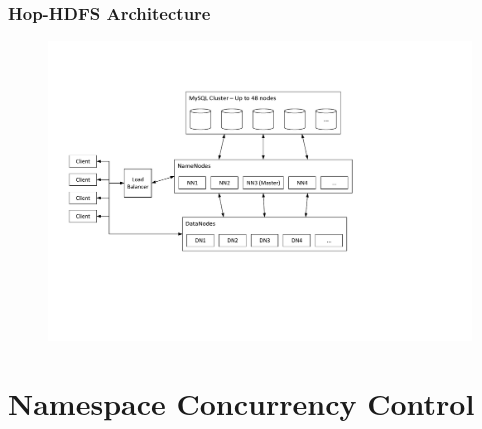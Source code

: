 \documentclass{beamer}
\begin{document}
\begin{frame}
	\frametitle{Hop-HDFS Architecture}
	\begin{figure}[h!]
		\centering
		\includegraphics[width=\linewidth]{figs/HopHDFSArchitecture.pdf}
	\end{figure}
\end{frame}
\section{Namespace Concurrency Control}
\end{document}
